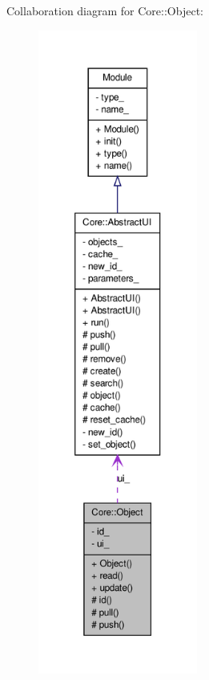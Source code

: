 Collaboration diagram for Core::Object:
\nopagebreak
\begin{figure}[H]
\begin{center}
\leavevmode
\includegraphics[height=600pt]{d8/d8e/classCore_1_1Object__coll__graph}
\end{center}
\end{figure}

